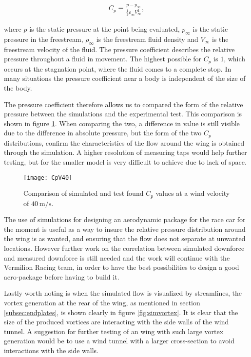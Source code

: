   \begin{align}
    C_p \equiv \frac{p-p_{\infty}}{\frac{1}{2}\rho_{\infty}V_{\infty}^2},
  \end{align}

  where $p$ is the static pressure at the point being evaluated, $p_{\infty}$ is the static pressure in the freestream, $\rho_{\infty}$ is the freestream fluid density and $V_{\infty}$ is the freestream velocity of the fluid. The pressure coefficient describes the relative pressure throughout a fluid in movement. The highest possible for $C_p$ is $1$, which occurs at the stagnation point, where the fluid comes to a complete stop. In many situations the pressure coefficient near a body is independent of the size of the body. 

  The pressure coefficient therefore allows us to compared the form of the relative pressure between the simulations and the experimental test. This comparison is shown in figure \ref{fig:CpV40}. When comparing the two, a difference in value is still visible due to the difference in absolute pressure, but the form of the two $C_p$ distributions, confirm the characteristics of the flow around the wing is obtained through the simulation. A higher resolution of measuring taps would help further testing, but for the smaller model is very difficult to achieve due to lack of space. 

  \begin{figure}
    \texttt{[image: CpV40]}
    \caption{Comparison of simulated and test found $C_p$ values at a wind velocity of $\SI{40}{\metre\per\second}$.}
    \label{fig:CpV40}
  \end{figure}

  The use of simulations for designing an aerodynamic package for the race car for the moment is useful as a way to insure the relative pressure distribution around the wing is as wanted, and ensuring that the flow does not separate at unwanted locations. However further work on the correlation between simulated downforce and measured downforce is still needed and the work will continue with the Vermilion Racing team, in order to have the best possibilities to design a good aero-package before having to build it.

  Lastly worth noting is when the simulated flow is visualized by streamlines, the vortex generation at the rear of the wing, as mentioned in section \ref{subsec:endplates}, is shown clearly in figure \ref{fig:simvortex}. It is clear that the size of the produced vortices are interacting with the side walls of the wind tunnel. A suggestion for further testing of an wing with such large vortex generation would be to use a wind tunnel with a larger cross-section to avoid interactions with the side walls.

